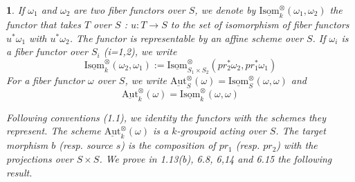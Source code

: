 \documentclass{article}
\newtheorem{env}[term]{}
\begin{document}
\begin{env}
  If $\omega_1$ and $\omega_2$ are two fiber functors over $S$, we denote by
  $\underline{\text{Isom}}^\otimes _ k (\omega_1, \omega_2)$  the functor that takes $T$ over $S$ : 
  $u : T \rightarrow S$ to the set of isomorphism of fiber functors $u^*\omega_1$ with $u^*\omega_2$. The functor 
  is representable by an affine scheme over $S$. If $\omega_i$ is a fiber functor over $S_i$ (i=1,2), we write
  $$ \underline{\text{Isom}}^\otimes _ k (\omega_2, \omega_1) := 
    \underline{\text{Isom}}^\otimes _ {S_1 \times S_2} (pr_2^*\omega_2, pr_1^*\omega_1) $$
  For a fiber functor $\omega$ over $S$, we write 
  $\underline {\text{Aut}}_S ^\otimes (\omega) = \underline{\text{Isom}}^\otimes _ S (\omega, \omega)$
  and
  $$\underline {\text{Aut}}_k ^\otimes (\omega) = \underline{\text{Isom}}^\otimes _ k (\omega, \omega)$$

  Following conventions (1.1), we identity the functors with the schemes they represent. The scheme 
  $\underline{\text{Aut}}^\otimes_k (\omega)$ is a $k$-groupoid acting over $S$. The target morphism $b$ (resp. source 
  $s$) is the composition of $pr_1$ (resp. $pr_2$) with the projections over $S \times S$. We prove in 
  1.13(b), 6.8, 6,14 and 6.15 the following result.
\end{env}
\end{document}
